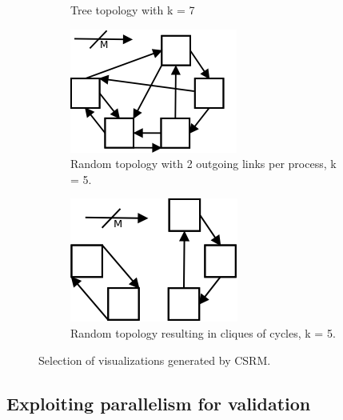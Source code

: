 \begin{figure}
\begin{subfigure}{0.5\textwidth}
        \caption{Tree topology with k = 7}
    \end{subfigure}%
    \begin{subfigure}{0.5\textwidth}\label{subfig:randomstatic}
	    \centering
		\includegraphics[width=0.6\linewidth]{figures/random.png}
		\caption{Random topology with 2 outgoing links per process, k = 5.}
    \end{subfigure}
	\begin{subfigure}{0.5\textwidth}\label{subfig:clique}
    		\centering
        \includegraphics[width=0.6\linewidth]{figures/clique.png}
        \caption{Random topology resulting in cliques of cycles, k = 5.}
    \end{subfigure}%
    \caption{Selection of visualizations generated by CSRM.}
    \label{fig:topologies}
\end{figure}

\subsection{Exploiting parallelism for validation}

